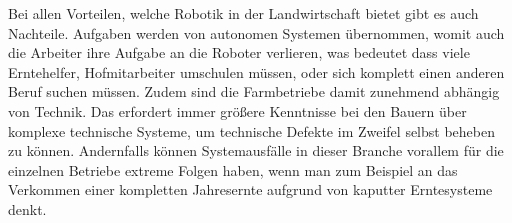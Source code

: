 Bei allen Vorteilen, welche Robotik in der Landwirtschaft bietet gibt es auch Nachteile. 
Aufgaben werden von autonomen Systemen übernommen, womit auch die Arbeiter ihre Aufgabe an die Roboter verlieren, was bedeutet dass viele Erntehelfer, Hofmitarbeiter umschulen müssen, oder sich komplett einen anderen Beruf suchen müssen.
Zudem sind die Farmbetriebe damit zunehmend abhängig von Technik. Das erfordert immer größere Kenntnisse bei den Bauern über komplexe technische Systeme, um technische Defekte im Zweifel selbst beheben zu können.
Andernfalls können Systemausfälle in dieser Branche vorallem für die einzelnen Betriebe extreme Folgen haben, wenn man zum Beispiel an das Verkommen einer kompletten Jahresernte aufgrund von kaputter Erntesysteme denkt.